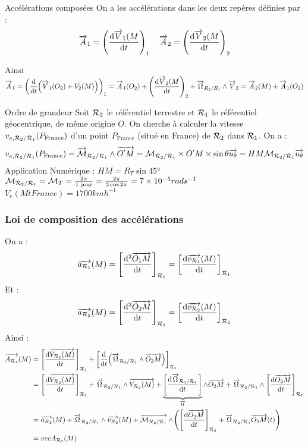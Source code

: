 \documentclass[a4paper,french,bookmarks]{book}
\begin{document}
    \begin{definition}{Accélérations composées}{}
        On a les accélérations dans les deux repères définies par :
        \[\overrightarrow{A}_1 = \left( \dfrac{\mathrm d \overrightarrow{V}_1(M}{\mathrm d t}\right)_1 \quad 
        \overrightarrow{A}_2 = \left( \dfrac{\mathrm d \overrightarrow{V}_2(M}{\mathrm d t}\right)_2\]

        Ainsi \( \overrightarrow{A}_1 = \left( \dfrac{\mathrm d}{\mathrm d t} \!\left(\overrightarrow{V}_1(O_2) + V_2(M )\right)\right)_1 = 
        \overrightarrow{A}_1(O_2) + \left(\dfrac{\mathrm d \overrightarrow{V}_2(M}{\mathrm d t}\right)_2 + \overrightarrow{\Omega}_{R_2/R_1} \wedge \overrightarrow{V}_2 = \overrightarrow{A}_2(M) + \overrightarrow{A}_1(O_2)\)
    \end{definition}
    
    \begin{example}{Ordre de grandeur}{}
        Soit $\mathcal{R}_2$ le référentiel terrestre et $\mathcal{R}_1$ le référentiel géocentrique, de même origine $O$. On cherche à calculer la vitesse $v_{e, \mathcal{R}_2 / \mathcal{R}_1}\!\left(P_\text{France}\right)$ d'un point $P_\text{France}$ (situé en France) de $\mathcal{R}_2$ dans $\mathcal{R}_1$. On a :
        \[ v_{e, \mathcal{R}_2 / \mathcal{R}_1}\!\left(P_\text{France}\right) = \overrightarrow{\mathcal{M}}_{\mathcal{R}_2 / \mathcal{R}_1} \wedge \overrightarrow{O'M} = \mathcal{M}_{\mathcal{R}_2 / \mathcal{R}_1} \times O'M \times \sin{\theta} \overrightarrow{u_\theta} = HM \mathcal{M}_{\mathcal{R}_2 / \mathcal{R}_1} \overrightarrow{u_\theta}\]
        Application Numérique : $HM = R_T \sin{45°}$
        $\mathcal{M}_{\mathcal{R}_2 / \mathcal{R}_1} = \mathcal{M}_T = \frac{2 \pi}{\text{1 jour}} = \frac{2 \pi}{3 \cos{2 \pi}} = 7 \times 10^{-5} rad s^{-1}$
        $V_e (Mt France) = 1700 km h^{-1}$
    \end{example}
    
    \subsubsection{Loi de composition des accélérations}
    
    On a :
    \[ \overrightarrow{a_{\mathcal{R}_1}}\!\left(M\right) = \left[\dfrac{\mathrm d^2 \overrightarrow{O_1M}}{\mathrm d t}\right]_{\mathcal{R}_1} = \left[\dfrac{\mathrm d \overrightarrow{v_{\mathcal{R}_1}}\!\left(M\right)}{\mathrm d t}\right]_{\mathcal{R}_1}\]
    Et :
    \[ \overrightarrow{a_{\mathcal{R}_2}}\!\left(M\right) = \left[\dfrac{\mathrm d^2 \overrightarrow{O_2M}}{\mathrm d t}\right]_{\mathcal{R}_2} = \left[\dfrac{\mathrm d \overrightarrow{v_{\mathcal{R}_2}}\!\left(M\right)}{\mathrm d t}\right]_{\mathcal{R}_2}\]
    Ainsi :
    \begin{align*}
        \vec{A_{\bcR_1}}\p{M} &= \intc{\dfrac{\dif \vec{V_{\bcR_2}\p{M}}}{\dif t}}_{\bcR_1} + \intc{\dfrac{\dif}{\dif t}\p{\vec \Omega_{\bcR_2/\bcR_1} \wedge \vec{O_2M}}}_{\bcR_1}\\
        &= \intc{\dfrac{\dif \vec{V_{\bcR_2}\p{M}}}{\dif t}}_{\bcR_1} + \vec \Omega_{\bcR_2/\bcR_1} \wedge \vec{V_{\bcR_2}\p{M}} + \underbrace{\intc{\dfrac{\dif \vec \Omega_{\bcR_2/\bcR_1}}{\dif t}}}_{\vec 0} \wedge \vec{O_2M} + \vec \Omega_{\bcR_2/\bcR_1} \wedge \intc{\dfrac{\dif \vec{O_2M}}{\dif t}}_{\bcR_1}\\
        &= \vec{a_{\bcR_2}}\p{M} + \vec \Omega_{\bcR_2/\bcR_1} \wedge \vec{v_{\bcR_2}}\p{M} + \vec{\bcM_{\bcR_2/\bcR_1}} \wedge \p{\intc{\dfrac{\dif \vec{O_2M}}{\dif t}}_{\bcR_2} + \vec \Omega_{\bcR_2/\bcR_1} \vec{O_2M}\p{t}}\\
        &= vec{A_{\bcR_2}}\p{M}
    \end{align*} 
    
\end{document}
